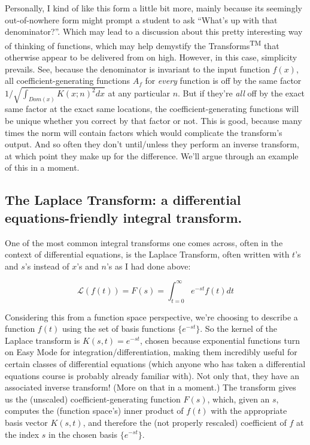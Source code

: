 \documentclass[../main/main.tex]{subfiles}
\begin{document}
Personally, I kind of like this form a little bit more, mainly
because its seemingly out-of-nowhere form might prompt a student
to ask ``What's up with that denominator?''. Which
may lead to a discussion about 
this pretty interesting way of thinking of functions,
which may help demystify the Transforms\textsuperscript{TM} 
that otherwise appear to be delivered from on high.
However, in this case, simplicity prevails.
See, because the denominator is invariant to the input function
\(f(x)\), all coefficient-generating functions \(A_f\) for
\emph{every} function is off by the same factor
\(1/\sqrt{\int_{Dom(x)} K(x;n)^2 dx}\) at any particular \(n\).
But if they're \emph{all} off by the exact same factor at the
exact same locations,
the coefficient-generating functions will be unique
whether you correct by that factor or not.
This is good, because many times the norm will contain
factors which would complicate the transform's output.
And so often they don't until/unless they perform an
inverse transform, 
at which point they make up for the difference.
We'll argue through an example of this in a moment.

\subsection{The Laplace Transform: a differential equations-friendly integral transform.}

One of the most common integral transforms one comes across,
often in the context of differential equations,
is the Laplace Transform, often written with 
\(t\)'s and \(s\)'s instead of \(x\)'s and \(n\)'s as
I had done above:

\[\mathcal{L}(f(t)) = F(s) = \int_{t=0}^{\infty}e^{-st}f(t)dt\]

Considering this from a function space perspective,
we're choosing to describe a function \(f(t)\)
using the set of basis functions \(\{e^{-st}\}\).
So the kernel of the Laplace transform is \(K(s,t) = e^{-st}\),
chosen because exponential functions turn on Easy Mode
for integration/differentiation, making them
incredibly useful for certain classes of
differential equations (which anyone who has 
taken a differential equations course is probably 
already familiar with). Not only
that, they have an associated inverse transform!
(More on that in a moment.)
The transform gives us the (unscaled)
coefficient-generating function \(F(s)\),
which, given an \(s\), computes the (function space's)
inner product of \(f(t)\) 
with the appropriate basis vector \(K(s,t)\), and therefore
the (not properly rescaled) coefficient of \(f\) at the index \(s\)
in the chosen basis \(\{e^{-st}\}\).\par
\end{document}
